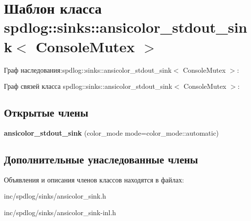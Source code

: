 \hypertarget{classspdlog_1_1sinks_1_1ansicolor__stdout__sink}{}\section{Шаблон класса spdlog\+:\+:sinks\+:\+:ansicolor\+\_\+stdout\+\_\+sink$<$ Console\+Mutex $>$}
\label{classspdlog_1_1sinks_1_1ansicolor__stdout__sink}


Граф наследования\+:spdlog\+:\+:sinks\+:\+:ansicolor\+\_\+stdout\+\_\+sink$<$ Console\+Mutex $>$\+:


Граф связей класса spdlog\+:\+:sinks\+:\+:ansicolor\+\_\+stdout\+\_\+sink$<$ Console\+Mutex $>$\+:
\subsection*{Открытые члены}
\begin{DoxyCompactItemize}
\item 
\mbox{\label{classspdlog_1_1sinks_1_1ansicolor__stdout__sink_a072d02ad0d85dfc6e09c4ed4a9ba356c}} 
{\bfseries ansicolor\+\_\+stdout\+\_\+sink} (color\+\_\+mode mode=color\+\_\+mode\+::automatic)
\end{DoxyCompactItemize}
\subsection*{Дополнительные унаследованные члены}


Объявления и описания членов классов находятся в файлах\+:\begin{DoxyCompactItemize}
\item 
inc/spdlog/sinks/ansicolor\+\_\+sink.\+h\item 
inc/spdlog/sinks/ansicolor\+\_\+sink-\/inl.\+h\end{DoxyCompactItemize}
